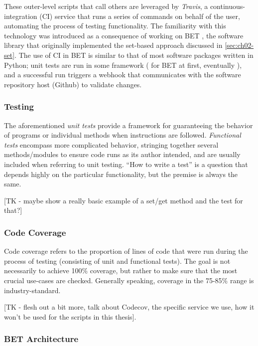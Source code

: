 These outer-level scripts that call others are leveraged by \emph{Travis}, a continuous-integration (CI) service that runs a series of commands on behalf of the user, automating the process of testing functionality.
The familiarity with this technology was introduced as a consequence of working on BET \cite{pyBET}, the software library that originally implemented the set-based approach discussed in \ref{sec:ch02-set}.
The use of CI in BET is similar to that of most software packages written in Python; unit tests are run in some framework ( for BET at first, eventually ), and a successful run triggers a webhook that communicates with the software repository host (Github) to validate changes.

\subsubsection{Testing}\label{sec:unit-testing}
The aforementioned \emph{unit tests} provide a framework for guaranteeing the behavior of programs or individual methods when instructions are followed.
\emph{Functional tests} encompass more complicated behavior, stringing together several methods/modules to ensure code runs as its author intended, and are usually included when referring to unit testing.
``How to write a test'' is a question that depends highly on the particular functionality, but the premise is always the same.

[TK - maybe show a really basic example of a set/get method and the test for that?]


\subsubsection{Code Coverage}\label{sec:code-coverage}

Code coverage refers to the proportion of lines of code that were run during the process of testing (consisting of unit and functional tests).
The goal is not necessarily to achieve 100\% coverage, but rather to make sure that the most crucial use-cases are checked.
Generally speaking, coverage in the 75-85\% range is industry-standard.

[TK - flesh out a bit more, talk about Codecov, the specific service we use, how it won't be used for the scripts in this thesis].


\subsubsection{BET Architecture}\label{sec:bet-architecture-overview}

